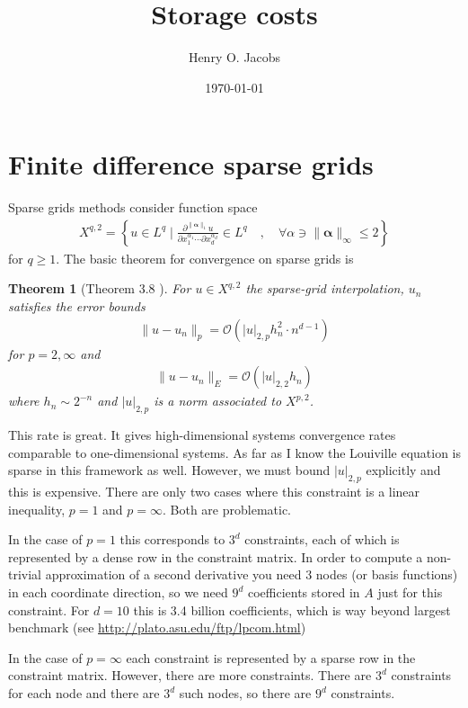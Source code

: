 \documentclass[12pt]{amsart}
\title{Storage costs}
\author{Henry O. Jacobs}
\date{\today}
\newtheorem{thm}{Theorem}
\begin{document}
\maketitle

\section{Finite difference sparse grids}

Sparse grids methods consider function space
\begin{align*}
	X^{q,2} = \left\{ u \in L^q \mid \frac{\partial^{\| \mathbf{\alpha} \|_1} u }{ \partial x_1^{\alpha_1} \cdots \partial x_d^{\alpha_d}} \in L^q \quad ,\quad  \forall \alpha \ni \|\mathbf{\alpha} \|_\infty \leq 2  \right\}
\end{align*}
for $q \geq 1$.
The basic theorem for convergence on sparse grids is

\begin{thm}[Theorem 3.8 \cite{BungartzGriebel2004}]
	For $u \in X^{q,2}$ the sparse-grid interpolation, $u_n$ satisfies the error bounds
	\begin{align*}
		\| u - u_n \|_{p} = \mathcal{O}( |u|_{2,p} h_n^2 \cdot n^{d-1} )
	\end{align*}
	for $p=2,\infty$
	and 
	\begin{align*}
		\| u - u_n \|_E = \mathcal{O}(|u|_{2,2} h_n)
	\end{align*}
	where $h_n \sim 2^{-n}$ and $| u|_{2,p}$ is a norm associated to $X^{p,2}$.
\end{thm}
This rate is great.  It gives high-dimensional systems convergence rates comparable to one-dimensional systems.
As far as I know the Louiville equation is sparse in this framework as well.
However, we must bound $|u|_{2,p}$ explicitly and this is expensive.
There are only two cases where this constraint is a linear inequality, $p= 1$ and $p=\infty$.  Both are problematic.

In the case of $p=1$ this corresponds to $3^d$ constraints, each of which is represented by a dense row in the constraint matrix.
In order to compute a non-trivial approximation of a second derivative you need $3$ nodes (or basis functions) in each coordinate direction, so we need $9^d$ coefficients stored in $A$ just for this constraint.
For $d=10$ this is 3.4 billion coefficients, which is way beyond largest benchmark (see \url{http://plato.asu.edu/ftp/lpcom.html})

In the case of $p=\infty$ each constraint is represented by a sparse row in the constraint matrix.  However, there are more constraints.
There are $3^d$ constraints for each node and there are $3^d$ such nodes, so there are $9^d$ constraints.
\end{document}
